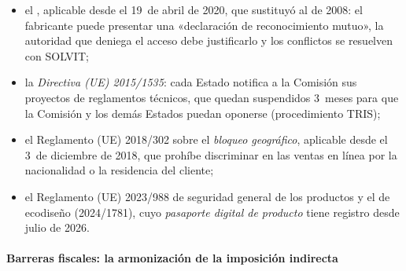 \documentclass[11pt]{article}
\begin{document}
\begin{itemize}
\begin{itemize}
  \item el , aplicable desde el 19~de abril de 2020, que sustituyó al de 2008: el fabricante puede presentar una «declaración de reconocimiento mutuo», la autoridad que deniega el acceso debe justificarlo y los conflictos se resuelven con SOLVIT;
  \item la \emph{Directiva (UE) 2015/1535}: cada Estado notifica a la Comisión sus proyectos de reglamentos técnicos, que quedan suspendidos 3~meses para que la Comisión y los demás Estados puedan oponerse (procedimiento TRIS)\nocite{UE2015TRIS};
  \item el Reglamento (UE) 2018/302 sobre el \emph{bloqueo geográfico}, aplicable desde el 3~de diciembre de 2018, que prohíbe discriminar en las ventas en línea por la nacionalidad o la residencia del cliente;
  \item el Reglamento (UE) 2023/988 de seguridad general de los productos y el de ecodiseño (2024/1781), cuyo \emph{pasaporte digital de producto} tiene registro desde julio de 2026\nocite{CE2026Pasaporte}.
  \end{itemize}
\end{itemize}

\paragraph{Barreras fiscales: la armonización de la imposición indirecta}\label{sec:barreras-fiscales}
\end{document}
